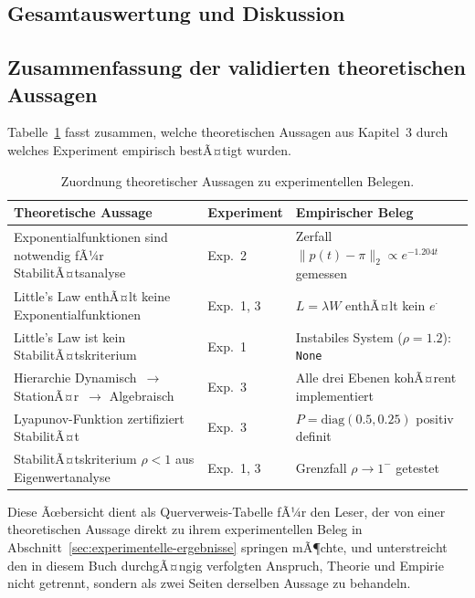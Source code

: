 ﻿\documentclass[a4paper,12pt]{report}
\theoremstyle{definition}
\begin{document}
\subsection{Gesamtauswertung und Diskussion}
\label{subsec:diskussion}

\subsection{Zusammenfassung der validierten theoretischen Aussagen}
\label{subsubsec:validierungen}

Tabelle~\ref{tab:validierungen} fasst zusammen, welche theoretischen
Aussagen aus Kapitel~3 durch welches Experiment empirisch bestÃ¤tigt
wurden.

\begin{table}[H]
	\centering
	\renewcommand{\arraystretch}{1.25}
	\begin{tabular}{@{}p{5.5cm}lp{4.5cm}@{}}
		\toprule
		\textbf{Theoretische Aussage} &
		\textbf{Experiment} &
		\textbf{Empirischer Beleg} \\
		\midrule
		Exponentialfunktionen sind notwendig fÃ¼r StabilitÃ¤tsanalyse &
		Exp.~2 &
		Zerfall $\|p(t)-\pi\|_2 \propto e^{-1.204t}$ gemessen \\
		
		Little's Law enthÃ¤lt keine Exponentialfunktionen &
		Exp.~1, 3 &
		$L = \lambda W$ enthÃ¤lt kein $e^{\cdot}$ \\
		
		Little's Law ist kein StabilitÃ¤tskriterium &
		Exp.~1 &
		Instabiles System ($\rho=1.2$): \texttt{None} \\
		
		Hierarchie Dynamisch~$\to$ StationÃ¤r~$\to$ Algebraisch &
		Exp.~3 &
		Alle drei Ebenen kohÃ¤rent implementiert \\
		
		Lyapunov-Funktion zertifiziert StabilitÃ¤t &
		Exp.~3 &
		$P = \text{diag}(0.5, 0.25)$ positiv definit \\
		
		StabilitÃ¤tskriterium $\rho < 1$ aus Eigenwertanalyse &
		Exp.~1, 3 &
		Grenzfall $\rho \to 1^-$ getestet \\
		\bottomrule
	\end{tabular}
	\caption{Zuordnung theoretischer Aussagen zu experimentellen Belegen.}
\label{tab:theorie-experiment}
	\label{tab:validierungen}
\end{table}

Diese Ãœbersicht dient als Querverweis-Tabelle fÃ¼r den Leser, der von einer theoretischen Aussage direkt zu ihrem experimentellen Beleg in Abschnitt~\ref{sec:experimentelle-ergebnisse} springen mÃ¶chte, und unterstreicht den in diesem Buch durchgÃ¤ngig verfolgten Anspruch, Theorie und Empirie nicht getrennt, sondern als zwei Seiten derselben Aussage zu behandeln.
\end{document}
